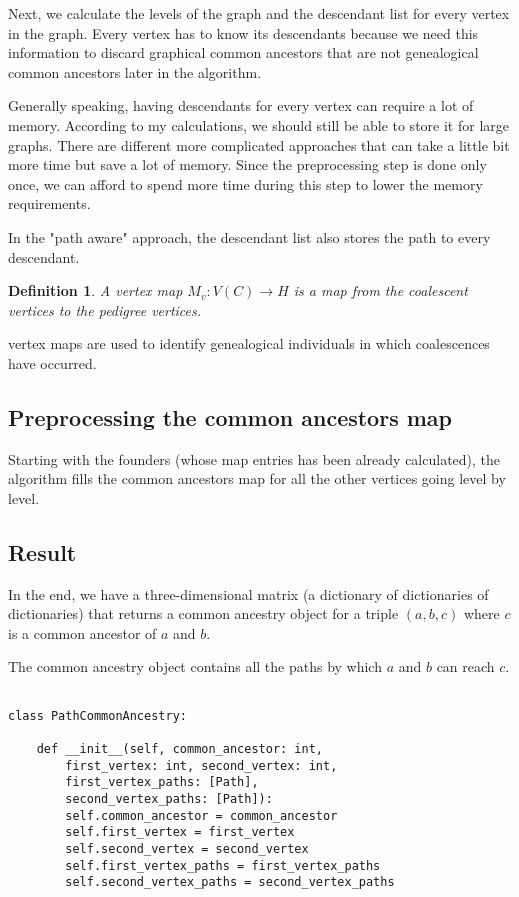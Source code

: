 \documentclass[14pt]{extarticle}
\newtheorem{definition}{Definition}
\begin{document}
Next, we calculate the levels of the graph and the descendant list for every vertex in the graph. Every vertex has to know its descendants because we need this information to discard graphical common ancestors that are not genealogical common ancestors later in the algorithm.

Generally speaking, having descendants for every vertex can require a lot of memory. According to my calculations, we should still be able to store it for large graphs. There are different more complicated approaches that can take a little bit more time but save a lot of memory. Since the preprocessing step is done only once, we can afford to spend more time during this step to lower the memory requirements.

In the "path aware" approach, the descendant list also stores the path to every descendant.



\begin{definition}
A vertex map $M_v:V(C) \rightarrow H$ is a map from the coalescent vertices to the pedigree vertices.   
\end{definition}
vertex maps are used to identify genealogical individuals in which coalescences have occurred. 

\subsection{Preprocessing the common ancestors map}

Starting with the founders (whose map entries has been already calculated), the algorithm fills the common ancestors map for all the other vertices going level by level.

\subsection{Result}

In the end, we have a three-dimensional matrix (a dictionary of dictionaries of dictionaries) that returns a common ancestry object for a triple $(a, b, c)$ where $c$ is a common ancestor of $a$ and $b$.

The common ancestry object contains all the paths by which $a$ and $b$ can reach $c$.

\begin{lstlisting}

class PathCommonAncestry:
	
	def __init__(self, common_ancestor: int,
		first_vertex: int, second_vertex: int,
		first_vertex_paths: [Path],
		second_vertex_paths: [Path]):
		self.common_ancestor = common_ancestor
		self.first_vertex = first_vertex
		self.second_vertex = second_vertex
		self.first_vertex_paths = first_vertex_paths
		self.second_vertex_paths = second_vertex_paths
	

\end{lstlisting}
\end{document}
